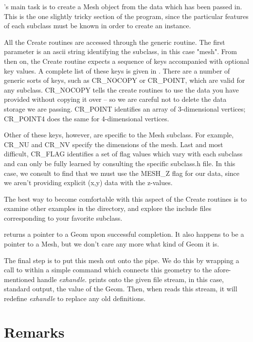 's main task is to create a Mesh object
from the data which has been passed in.  This is the one slightly
tricky section of the program, since the particular features of
each subclass must be known in order to create an instance.

All the Create routines are accessed through the generic 
 routine.  The first parameter is an ascii
string identifying the subclass, in this case "mesh".  From then
on, the Create routine expects a sequence of keys 
accompanied with optional key values.  A complete list of these
keys is given in .  There are a
number of generic sorts of keys, such as CR\_NOCOPY or CR\_POINT, which are valid
for any subclass.  CR\_NOCOPY tells the create routines to
use the data you have provided without copying it over -- so we
are careful not to delete the data storage we are passing.
CR\_POINT identifies an array of 3-dimensional vertices; CR\_POINT4
does the same for 4-dimensional vertices.

Other of these keys, however, are specific to
the Mesh subclass.  For example, CR\_NU and CR\_NV specify the
dimensions of the mesh.  Last and most difficult, CR\_FLAG identifies
a set of flag values which vary with each subclass and can
only be fully learned by consulting the specific subclass.h file.
In this case, we consult  to  find that
we must use the MESH\_Z flag  for our data, since we aren't 
providing explicit (x,y) data with the z-values.

The best way to  become comfortable with this aspect of the 
Create routines is to examine other examples in the 
directory, and explore the include files corresponding to your
favorite subclass.  

 returns a pointer to a Geom upon successful
completion.  It also happens to be a pointer to a Mesh, but we
don't care any more what kind of Geom it is.  

The final step is to put this mesh out onto the pipe.  We do this
by wrapping a call to  within  a simple
command which connects this geometry to the afore-mentioned
handle {\em exhandle}.   prints onto
the given file stream, in this case, standard output,
the value of the Geom.  Then, when  reads
this stream, it will redefine {\em exhandle} to replace any
old definitions.

\section{Remarks}

